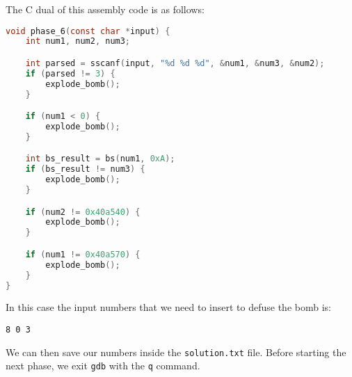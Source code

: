 \documentclass[a4paper,12pt]{report}  %
\newcommand{\lstinlinebg}[1]{\colorbox{backcolour}{\lstinline|#1|}}
\begin{document}
The C dual of this assembly code is as follows:
\begin{lstlisting}[language=C,keywords={int, char, if, void, sscanf, explode_bomb, const, bs}]
void phase_6(const char *input) {
    int num1, num2, num3;

    int parsed = sscanf(input, "%d %d %d", &num1, &num3, &num2);
    if (parsed != 3) {
        explode_bomb();
    }

    if (num1 < 0) {
        explode_bomb();
    }

    int bs_result = bs(num1, 0xA);
    if (bs_result != num3) {
        explode_bomb();
    }

    if (num2 != 0x40a540) {
        explode_bomb();
    }

    if (num1 != 0x40a570) {
        explode_bomb();
    }
}
\end{lstlisting}
In this case the input numbers that we need to insert to defuse the bomb is:
\begin{lstlisting}[numbers=none]
8 0 3
\end{lstlisting}
We can then save our numbers inside the \lstinlinebg{solution.txt} file.
Before starting the next phase, we exit \lstinlinebg{gdb} with the \lstinlinebg{q} command.
\end{document}
